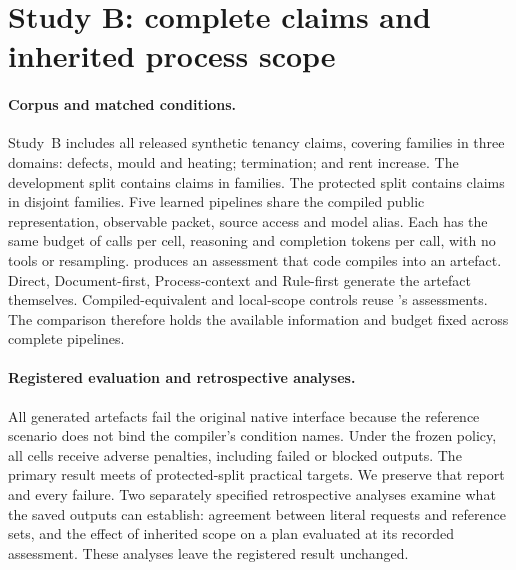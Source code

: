 \section{Study B: complete claims and inherited process scope}
\label{sec:native}

\paragraph{Corpus and matched conditions.}
Study~B includes all \nbClaims{} released synthetic tenancy claims,
covering \nbFamilies{} families in three domains: defects, mould and
heating; termination; and rent increase. The development split contains
\nbDevClaims{} claims in \nbDevFamilies{} families. The protected split
contains \nbHidClaims{} claims in \nbHidFamilies{} disjoint families.
Five learned pipelines share the compiled public representation, observable
packet, source access and model alias. Each has the same budget of
\nbCallsPerCell{} calls per cell, \nbReasoning{} reasoning and
\nbTokens{} completion tokens per call, with no tools or resampling.
\casepath produces an assessment that code compiles into an artefact.
Direct, Document-first, Process-context and Rule-first generate the artefact
themselves. Compiled-equivalent and local-scope controls reuse \casepath's
assessments. The comparison therefore holds the available information and
budget fixed across complete pipelines.

\paragraph{Registered evaluation and retrospective analyses.}
All \nrArtifactFailures{} generated artefacts fail the original native
interface because the reference scenario does not bind the compiler's
condition names. Under the frozen policy, all \nbCells{} cells receive
adverse penalties, including \nrRequestPenalties{} failed or blocked
outputs. The primary result meets \nrPrimaryMet{} of \nrPrimaryTotal{}
protected-split practical targets. We preserve that report and every failure.
Two separately specified retrospective analyses examine what the saved
outputs can establish: agreement between literal requests and reference
sets, and the effect of inherited scope on a plan evaluated at its recorded
assessment. These analyses leave the registered result unchanged.

